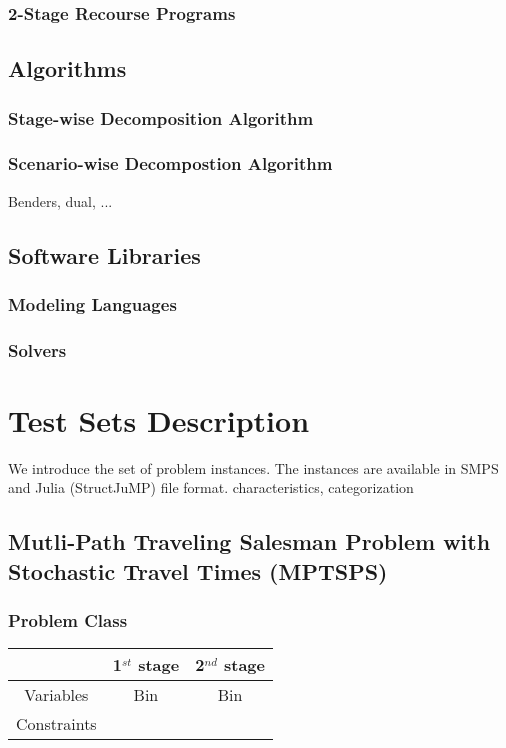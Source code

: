 \subsubsection{2-Stage Recourse Programs}


\subsection{Algorithms}
\subsubsection{Stage-wise Decomposition Algorithm}
\subsubsection{Scenario-wise Decompostion Algorithm}
Benders, dual, ...

\subsection{Software Libraries}
\subsubsection{Modeling Languages}
\subsubsection{Solvers}

\section{Test Sets Description}

We introduce the set of problem instances. The instances are available in SMPS and Julia (StructJuMP) file format. characteristics, categorization
\subsection{Mutli-Path Traveling Salesman Problem with Stochastic Travel Times (MPTSPS)}
\subsubsection{Problem Class}
\begin{table}[H]
	\centering
	\label{mptsps-class}
	\begin{tabular}{|c|c|c|}
		\hline
		& 1$^{st}$ stage & 2$^{nd}$ stage \\ \hline
		Variables   & Bin & Bin               \\ \hline
		Constraints &                &                \\ \hline
	\end{tabular}
\end{table}
